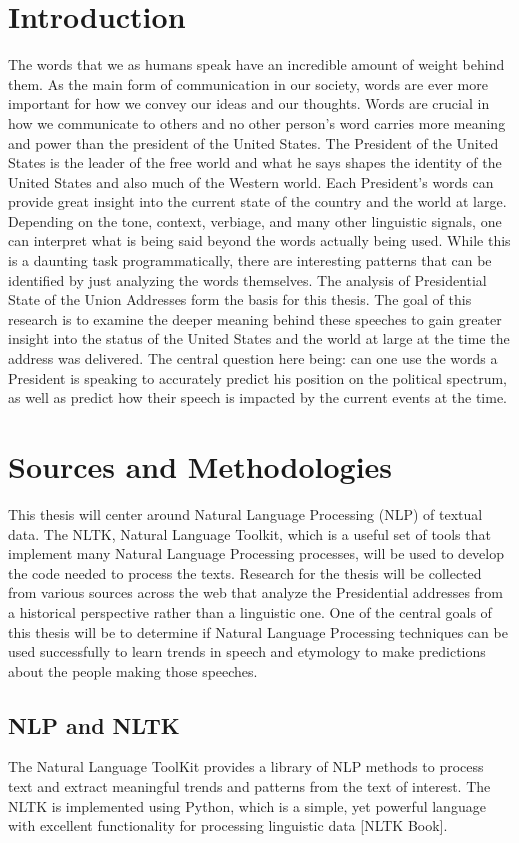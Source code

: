 \documentclass[reqno,12pt,oneside,letter]{report}
\begin{document}
\section*{Introduction}
The words that we as humans speak have an incredible amount of weight behind them.
As the main form of communication in our society, words are ever more important for how we convey our ideas and our thoughts.
Words are crucial in how we communicate to others and no other person's word carries more meaning and power than the president of the United States.
The President of the United States is the leader of the free world and what he says shapes the identity of the United States and also much of the Western world.
Each President's words can provide great insight into the current state of the country and the world at large.
Depending on the tone, context, verbiage, and many other linguistic signals, one can interpret what is being said beyond the words actually being used.
While this is a daunting task programmatically, there are interesting patterns that can be identified by just analyzing the words themselves.
The analysis of Presidential State of the Union Addresses form the basis for this thesis. 
The goal of this research is to examine the deeper meaning behind these speeches to gain greater insight into the status of the United States and the world at large at the time the address was delivered. 
The central question here being: can one use the words a President is speaking to accurately predict his position on the political spectrum, as well as predict how their speech is impacted by the current events at the time.

\section*{Sources and Methodologies}
This thesis will center around Natural Language Processing (NLP) of textual data.
The NLTK, Natural Language Toolkit, which is a useful set of tools that implement many Natural Language Processing processes, will be used to develop the code needed to process the texts.
Research for the thesis will be collected from various sources across the web that analyze the Presidential addresses from a historical perspective rather than a linguistic one.
One of the central goals of this thesis will be to determine if Natural Language Processing techniques can be used successfully to learn trends in speech and etymology to make predictions about the people making those speeches.

\subsection*{NLP and NLTK}
The Natural Language ToolKit provides a library of NLP methods to process text and extract meaningful trends and patterns from the text of interest.
The NLTK is implemented using Python, which is a simple, yet powerful language with excellent functionality for processing linguistic data [NLTK Book].
\end{document}
